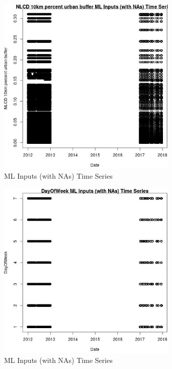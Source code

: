 \begin{figure} 
\centering  
\includegraphics[width=0.77\textwidth]{Code_Outputs/Report_ML_input_PM25_Step4_part_e_de_duplicated_aves_compiled_2019-05-14wNAs_NLCD_10km_percent_urban_buffervDate.jpg} 
\caption{\label{fig:Report_ML_input_PM25_Step4_part_e_de_duplicated_aves_compiled_2019-05-14wNAsNLCD_10km_percent_urban_buffervDate}ML Inputs (with NAs) Time Series} 
\end{figure} 
 

\begin{figure} 
\centering  
\includegraphics[width=0.77\textwidth]{Code_Outputs/Report_ML_input_PM25_Step4_part_e_de_duplicated_aves_compiled_2019-05-14wNAs_DayOfWeekvDate.jpg} 
\caption{\label{fig:Report_ML_input_PM25_Step4_part_e_de_duplicated_aves_compiled_2019-05-14wNAsDayOfWeekvDate}ML Inputs (with NAs) Time Series} 
\end{figure} 
 

